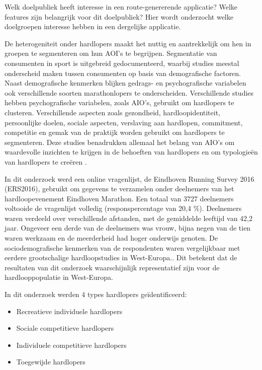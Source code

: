     Welk doelpubliek heeft interesse in een route-genererende applicatie? Welke features zijn belangrijk voor dit doelpubliek?
    Hier wordt onderzocht welke doelgroepen interesse hebben in een dergelijke applicatie.


    De heterogeniteit onder hardlopers maakt het nuttig en aantrekkelijk om hen in groepen te segmenteren om hun AOI's te begrijpen. 
    Segmentatie van consumenten in sport is uitgebreid gedocumenteerd, waarbij studies meestal onderscheid maken tussen consumenten 
    op basis van demografische factoren. Naast demografische kenmerken blijken gedrags- en psychografische variabelen ook 
    verschillende soorten marathonlopers te onderscheiden. Verschillende studies hebben psychografische variabelen, zoals AIO's, 
    gebruikt om hardlopers te clusteren. Verschillende aspecten zoals gezondheid, hardloopidentiteit, persoonlijke doelen, sociale aspecten, 
    verslaving aan hardlopen, commitment, competitie en gemak van de praktijk worden gebruikt om hardlopers te segmenteren.
    Deze studies benadrukken allemaal het belang van AIO's om waardevolle inzichten te krijgen in de behoeften van hardlopers 
    en om typologieën van hardlopers te creëren \textcite{Janssen2020}. 


    In dit onderzoek werd een online vragenlijst, de Eindhoven Running Survey 2016 (ERS2016), 
    gebruikt om gegevens te verzamelen onder deelnemers van het hardloopevenement Eindhoven Marathon. 
    Een totaal van 3727 deelnemers voltooide de vragenlijst volledig (responspercentage van 20,4 \%). 
    Deelnemers waren verdeeld over verschillende afstanden, met de gemiddelde leeftijd van 42,2 jaar. 
    Ongeveer een derde van de deelnemers was vrouw, bijna negen van de tien waren werkzaam en de meerderheid had hoger onderwijs genoten. 
    De sociodemografische kenmerken van de respondenten waren vergelijkbaar met eerdere grootschalige hardloopstudies in West-Europa.\textcite{Janssen2020}.
    Dit betekent dat de resultaten van dit onderzoek waarschijnlijk representatief zijn voor de hardlooppopulatie in West-Europa.


    In dit onderzoek werden 4 types hardlopers geïdentificeerd:
    \begin{itemize}
        \item Recreatieve individuele hardlopers
        \item Sociale competitieve hardlopers
        \item Individuele competitieve hardlopers
        \item Toegewijde hardlopers
    \end{itemize}


